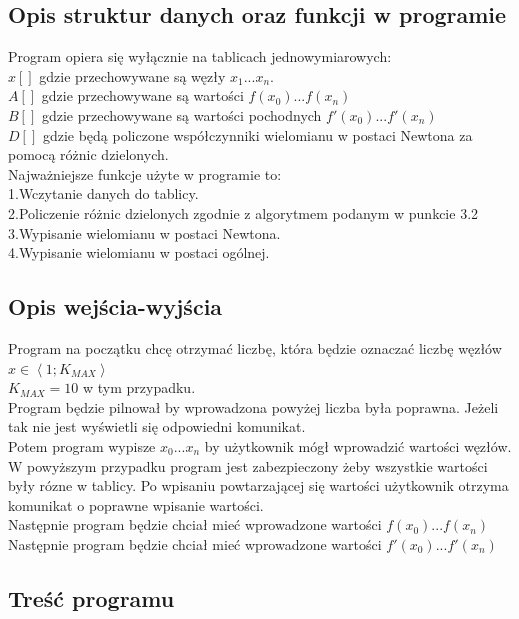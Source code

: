\documentclass[16pt]{article} %
\begin{document}
\subsection{Opis struktur danych oraz funkcji w programie}
Program opiera się wyłącznie na tablicach jednowymiarowych:\\
$x[]$ gdzie przechowywane są węzły $x_1 ... x_n$.\\ 
$A[]$ gdzie przechowywane są wartości $f(x_0)...f(x_n)$\\
$B[]$ gdzie przechowywane są wartości pochodnych $f'(x_0)...f'(x_n)$\\
$D[]$ gdzie będą policzone współczynniki wielomianu w postaci Newtona za pomocą różnic dzielonych.\\
Najważniejsze funkcje użyte w programie to:\\
1.Wczytanie danych do tablicy.\\
2.Policzenie różnic dzielonych zgodnie z algorytmem podanym w punkcie 3.2\\
3.Wypisanie wielomianu w postaci Newtona.\\
4.Wypisanie wielomianu w postaci ogólnej.
\subsection{Opis wejścia-wyjścia}
Program na początku chcę otrzymać liczbę, która będzie oznaczać liczbę węzłów $x \in \left\langle 1;K_{MAX} \right\rangle$\\
$K_{MAX}=10$ w tym przypadku.\\
Program będzie pilnował by wprowadzona powyżej liczba była poprawna. Jeżeli tak nie jest wyświetli się odpowiedni komunikat.\\
Potem program wypisze $x_0 ... x_n$ by użytkownik mógł wprowadzić wartości węzłów.\\
W powyższym przypadku program jest zabezpieczony żeby wszystkie wartości były rózne w tablicy. Po wpisaniu powtarzającej się wartości użytkownik otrzyma
komunikat o poprawne wpisanie wartości.\\
Następnie program będzie chciał mieć wprowadzone wartości  $f(x_0)...f(x_n)$\\
Następnie program będzie chciał mieć wprowadzone wartości  $f'(x_0)...f'(x_n)$\\


\subsection{Treść programu}
\lstset{language=C}
\end{document}
